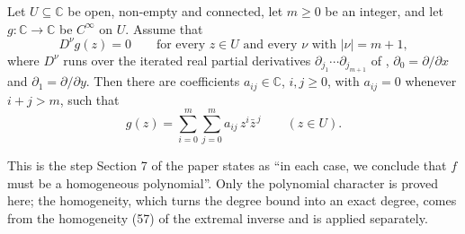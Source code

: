 \begin{lemma}
Let $U\subseteq\mathbb{C}$ be open, non-empty and connected, let $m\ge0$ be an
integer, and
let $g\colon\mathbb{C}\to\mathbb{C}$ be $C^\infty$ on $U$.  Assume that
\[
  D^\nu g(z)=0\qquad\text{for every }z\in U\text{ and every }\nu\text{ with }
  |\nu|=m+1,
\]
where $D^\nu$ runs over the iterated real partial derivatives
$\partial_{j_1}\cdots\partial_{j_{m+1}}$ of ,
$\partial_0=\partial/\partial x$ and $\partial_1=\partial/\partial y$.  Then
there are coefficients $a_{ij}\in\mathbb{C}$, $i,j\ge0$, with $a_{ij}=0$
whenever $i+j>m$, such that
\[
  g(z)=\sum_{i=0}^{m}\sum_{j=0}^{m}a_{ij}\,z^{i}\bar z^{\,j}
  \qquad(z\in U).
\]

This is the step Section 7 of the paper states as ``in each case, we conclude
that $f$ must be a homogeneous polynomial''.  Only the polynomial character is
proved here; the homogeneity, which turns the degree bound into an exact
degree, comes from the homogeneity (57) of the extremal inverse and is applied
separately.
\end{lemma}
